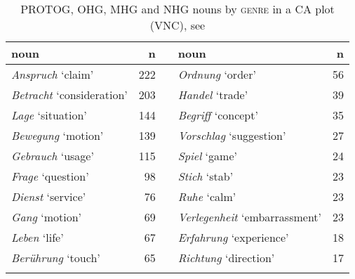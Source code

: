 \documentclass[output=paper,colorlinks,citecolor=brown]{langscibook}
\begin{document}
\begin{table}
\begin{tabularx}{\textwidth}{lr X lr}
\lsptoprule
{noun} &  n && noun & n\\
\midrule
\textit{Anspruch} ‘claim' & 222  &&              \textit{Ordnung} ‘order' & 56\\
\textit{Betracht} ‘consideration' & 203  &&      \textit{Handel} ‘trade' & 39\\
\textit{Lage} ‘situation' & 144  &&              \textit{Begriff} ‘concept' & 35\\
\textit{Bewegung} ‘motion' & 139  &&             \textit{Vorschlag} ‘suggestion' & 27\\
\textit{Gebrauch} ‘usage' & 115  &&              \textit{Spiel} ‘game' & 24\\
\textit{Frage} ‘question' & 98  &&               \textit{Stich} ‘stab' & 23\\
\textit{Dienst} ‘service' & 76  &&               \textit{Ruhe} ‘calm' & 23\\
\textit{Gang} ‘motion' & 69  &&                  \textit{Verlegenheit} ‘embarrassment' & 23\\
\textit{Leben} ‘life' & 67 &&                     \textit{Erfahrung} ‘experience' & 18\\
\textit{Berührung} ‘touch' & 65  &&              \textit{Richtung} ‘direction' & 17\\
\lspbottomrule
\end{tabularx}
\caption{PROTOG, OHG, MHG and NHG nouns by \textsc{genre} \textup{in a CA plot (VNC)}, see }
 \label{tab:fleissner:tofig12}
\end{table}
\end{document}
